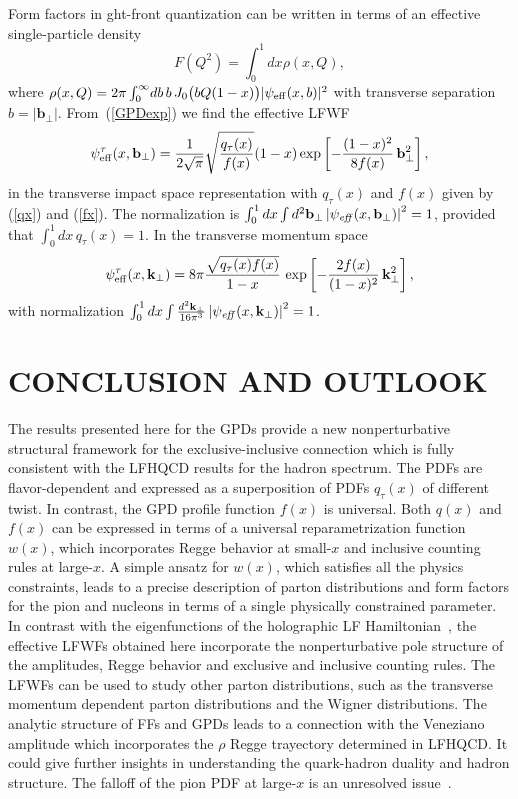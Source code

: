 \documentclass[aps,prl,reprint,groupedaddress, preprintnumbers]{revtex4-1}
\def\be{\begin{equation}}
\def\ee{\end{equation}}
\newcommand{\req}[1]{(\ref{#1})}
\newcommand{\mbf}[1]{\mathbf{#1}}
\begin{document}
Form factors in ght-front quantization can be written in terms of an effective single-particle density~\cite{Soper:1976jc}
\be
F(Q^2) = \int_0^1 dx \rho(x, Q),
\ee
where $\rho(x,Q) =2 \pi \int_0^\infty \!  db \,  b \, J_0\big(b Q (1-x)\big) \vert \psi_{\rm eff} (x,b)\vert^2$ with transverse separation $b = \vert \mbf{b}_\perp \vert$.
From~\req{GPDexp} we find the effective LFWF
\be \label{LFWFb}
\psi_{\rm eff}^\tau(x, \mbf{b}_\perp) = \frac{1}{2 \sqrt{\pi}} \sqrt{\frac{q_\tau(x)}{f(x)}} 
 (1-x) \exp \left[ - \frac{(1-x)^2 }{8 f(x) } \, \mbf{b}_\perp^2\right],
\ee
in the transverse impact space representation with $q_\tau(x)$ and $f(x)$ given by \req{qx} and \req{fx}. The normalization is
$\int_0^1 dx \int d^2\mbf{b}_\perp \left \vert  \psi_{\it eff}(x, \mbf{b}_\perp) \right\vert^2 = 1$, provided that $\int_0^1 dx \, q_\tau(x) = 1$.
In the transverse momentum space 
\be  \label{LFWFk}
\psi_{\rm eff}^\tau(x, \mbf{k}_\perp) 
= 8 \pi \frac{ \sqrt{q_\tau(x) f(x) }}{1-x} \,
\exp\left[ -  \frac{2 f(x)}{(1-x)^2} \, \mbf{k}_\perp^2 \right],
\ee
with normalization $\int_0^1 dx \int \frac{d^2\mbf{k}_\perp}{16 \pi^3} \left\vert  \psi_{\it eff}(x, \mbf{k}_\perp) \right\vert^2=1$.





\section{CONCLUSION AND OUTLOOK}

The results presented here for the GPDs provide a new nonperturbative structural framework for the exclusive-inclusive connection which is fully consistent with the LFHQCD results for the hadron spectrum. The PDFs are flavor-dependent and expressed as a superposition of PDFs $q_\tau(x)$ of different twist. In contrast, the GPD profile function $f(x)$ is universal. Both $q(x)$ and $f(x)$ can be expressed in terms of a universal reparametrization function $w(x)$, which incorporates Regge behavior at small-$x$ and  inclusive counting rules at large-$x$. A simple ansatz for $w(x)$, which satisfies all the physics constraints, leads to a precise description of parton distributions and form factors for the pion and nucleons in terms of a single physically constrained parameter.  In contrast with the eigenfunctions of the holographic LF Hamiltonian~\cite{Brodsky:2014yha}, the effective LFWFs obtained here incorporate the nonperturbative pole structure of the amplitudes, Regge behavior and exclusive and inclusive counting rules. The LFWFs  can be used to study other parton distributions, such as the transverse momentum dependent parton distributions and the Wigner distributions. The analytic structure of FFs and GPDs leads to a connection with the Veneziano amplitude  which incorporates the $\rho$ Regge trayectory determined in LFHQCD. It could give further insights in understanding the quark-hadron duality and hadron structure. The falloff of the pion PDF at large-$x$ is an unresolved issue~\cite{Holt:2010vj}. 
\end{document}
